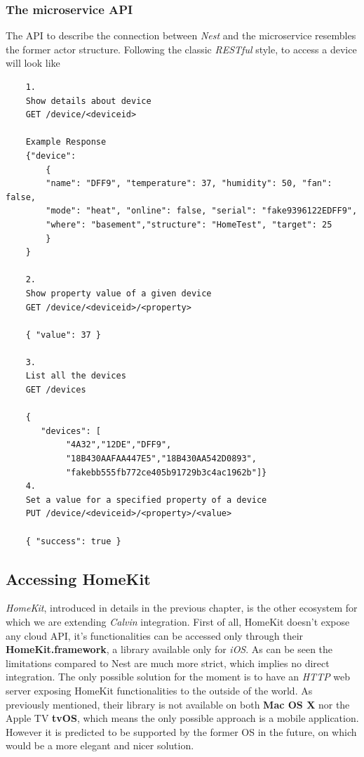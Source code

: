 \subsubsection{The microservice API}

The API to describe the connection between \textit{Nest} and the microservice
resembles the former actor structure.
Following the classic \textit{RESTful} style, to access a device will look like
\begin{verbatim}
    1.
    Show details about device
    GET /device/<deviceid>

    Example Response
    {"device":
        {
        "name": "DFF9", "temperature": 37, "humidity": 50, "fan": false,
        "mode": "heat", "online": false, "serial": "fake9396122EDFF9",
        "where": "basement","structure": "HomeTest", "target": 25
        }
    }

    2.
    Show property value of a given device
    GET /device/<deviceid>/<property>

    { "value": 37 }

    3.
    List all the devices
    GET /devices

    {
       "devices": [
            "4A32","12DE","DFF9",
            "18B430AAFAA447E5","18B430AA542D0893",
            "fakebb555fb772ce405b91729b3c4ac1962b"]}
    4.
    Set a value for a specified property of a device
    PUT /device/<deviceid>/<property>/<value>

    { "success": true }
\end{verbatim}




\subsection{Accessing HomeKit}

\textit{HomeKit}, introduced in details in the previous chapter, is the other ecosystem
for which we are extending \textit{Calvin} integration. First of all, HomeKit doesn't
expose any cloud API, it's functionalities can be accessed only through their \textbf{HomeKit.framework},
a library available only for \textit{iOS}. As can be seen the limitations compared to Nest
are much more strict, which implies no direct integration. The only possible solution for the
moment is to have an \textit{HTTP} web server exposing HomeKit functionalities to the outside of
the world. As previously mentioned, their library is not available on both \textbf{Mac OS X} nor
the Apple TV \textbf{tvOS}, which means the only possible approach is a mobile application.
However it is predicted to be supported by the former OS in the future, on which would be a more
elegant and nicer solution.\\


